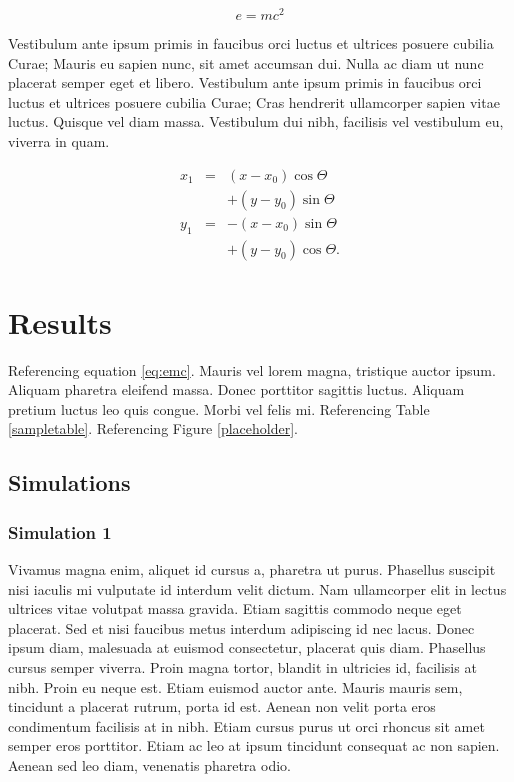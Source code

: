 \documentclass[draft,jgrga]{AGUTeX}
\begin{document}
\begin{article}
\begin{equation}
\label{eq:emc}
e = mc^2
\end{equation}

Vestibulum ante ipsum primis in faucibus orci luctus et ultrices posuere cubilia Curae; Mauris eu sapien nunc, sit amet accumsan dui. Nulla ac diam ut nunc placerat semper eget et libero. Vestibulum ante ipsum primis in faucibus orci luctus et ultrices posuere cubilia Curae; Cras hendrerit ullamcorper sapien vitae luctus. Quisque vel diam massa. Vestibulum dui nibh, facilisis vel vestibulum eu, viverra in quam.

\begin{eqnarray}
  x_{1} & = & (x - x_{0}) \cos \Theta \nonumber \\
        && + (y - y_{0}) \sin \Theta  \nonumber \\
  y_{1} & = & -(x - x_{0}) \sin \Theta \nonumber \\
        && + (y - y_{0}) \cos \Theta.
\end{eqnarray}


\section{Results}

Referencing equation \ref{eq:emc}. Mauris vel lorem magna, tristique auctor ipsum. Aliquam pharetra eleifend massa. Donec porttitor sagittis luctus. Aliquam pretium luctus leo quis congue. Morbi vel felis mi. Referencing Table \ref{sampletable}. Referencing Figure \ref{placeholder}.

\subsection{Simulations}

\subsubsection{Simulation 1}

Vivamus magna enim, aliquet id cursus a, pharetra ut purus. Phasellus suscipit nisi iaculis mi vulputate id interdum velit dictum. Nam ullamcorper elit in lectus ultrices vitae volutpat massa gravida. Etiam sagittis commodo neque eget placerat. Sed et nisi faucibus metus interdum adipiscing id nec lacus. Donec ipsum diam, malesuada at euismod consectetur, placerat quis diam. Phasellus cursus semper viverra. Proin magna tortor, blandit in ultricies id, facilisis at nibh. Proin eu neque est. Etiam euismod auctor ante. Mauris mauris sem, tincidunt a placerat rutrum, porta id est. Aenean non velit porta eros condimentum facilisis at in nibh. Etiam cursus purus ut orci rhoncus sit amet semper eros porttitor. Etiam ac leo at ipsum tincidunt consequat ac non sapien. Aenean sed leo diam, venenatis pharetra odio.


\end{article}
\end{document}
